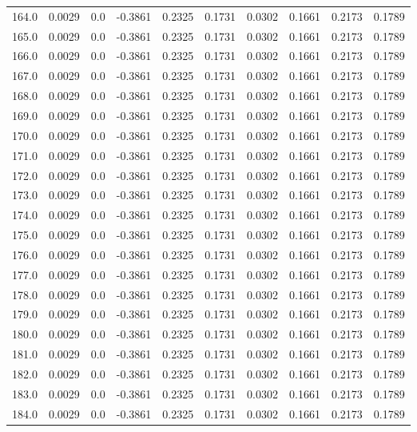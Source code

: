 \begin{longtable}{lrrrrrrrrr}
164.0 & 0.0029 & 0.0 & -0.3861 & 0.2325 & 0.1731 & 0.0302 & 0.1661 & 0.2173 & 0.1789 \\
165.0 & 0.0029 & 0.0 & -0.3861 & 0.2325 & 0.1731 & 0.0302 & 0.1661 & 0.2173 & 0.1789 \\
166.0 & 0.0029 & 0.0 & -0.3861 & 0.2325 & 0.1731 & 0.0302 & 0.1661 & 0.2173 & 0.1789 \\
167.0 & 0.0029 & 0.0 & -0.3861 & 0.2325 & 0.1731 & 0.0302 & 0.1661 & 0.2173 & 0.1789 \\
168.0 & 0.0029 & 0.0 & -0.3861 & 0.2325 & 0.1731 & 0.0302 & 0.1661 & 0.2173 & 0.1789 \\
169.0 & 0.0029 & 0.0 & -0.3861 & 0.2325 & 0.1731 & 0.0302 & 0.1661 & 0.2173 & 0.1789 \\
170.0 & 0.0029 & 0.0 & -0.3861 & 0.2325 & 0.1731 & 0.0302 & 0.1661 & 0.2173 & 0.1789 \\
171.0 & 0.0029 & 0.0 & -0.3861 & 0.2325 & 0.1731 & 0.0302 & 0.1661 & 0.2173 & 0.1789 \\
172.0 & 0.0029 & 0.0 & -0.3861 & 0.2325 & 0.1731 & 0.0302 & 0.1661 & 0.2173 & 0.1789 \\
173.0 & 0.0029 & 0.0 & -0.3861 & 0.2325 & 0.1731 & 0.0302 & 0.1661 & 0.2173 & 0.1789 \\
174.0 & 0.0029 & 0.0 & -0.3861 & 0.2325 & 0.1731 & 0.0302 & 0.1661 & 0.2173 & 0.1789 \\
175.0 & 0.0029 & 0.0 & -0.3861 & 0.2325 & 0.1731 & 0.0302 & 0.1661 & 0.2173 & 0.1789 \\
176.0 & 0.0029 & 0.0 & -0.3861 & 0.2325 & 0.1731 & 0.0302 & 0.1661 & 0.2173 & 0.1789 \\
177.0 & 0.0029 & 0.0 & -0.3861 & 0.2325 & 0.1731 & 0.0302 & 0.1661 & 0.2173 & 0.1789 \\
178.0 & 0.0029 & 0.0 & -0.3861 & 0.2325 & 0.1731 & 0.0302 & 0.1661 & 0.2173 & 0.1789 \\
179.0 & 0.0029 & 0.0 & -0.3861 & 0.2325 & 0.1731 & 0.0302 & 0.1661 & 0.2173 & 0.1789 \\
180.0 & 0.0029 & 0.0 & -0.3861 & 0.2325 & 0.1731 & 0.0302 & 0.1661 & 0.2173 & 0.1789 \\
181.0 & 0.0029 & 0.0 & -0.3861 & 0.2325 & 0.1731 & 0.0302 & 0.1661 & 0.2173 & 0.1789 \\
182.0 & 0.0029 & 0.0 & -0.3861 & 0.2325 & 0.1731 & 0.0302 & 0.1661 & 0.2173 & 0.1789 \\
183.0 & 0.0029 & 0.0 & -0.3861 & 0.2325 & 0.1731 & 0.0302 & 0.1661 & 0.2173 & 0.1789 \\
184.0 & 0.0029 & 0.0 & -0.3861 & 0.2325 & 0.1731 & 0.0302 & 0.1661 & 0.2173 & 0.1789 \\

\end{longtable}

